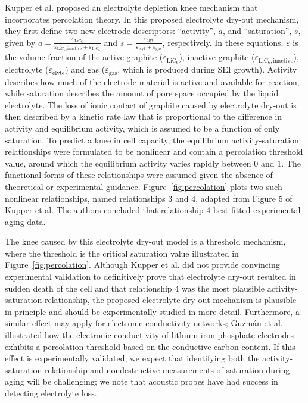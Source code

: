 \documentclass[journal=jpclcd,manuscript=article]{achemso}
\begin{document}
Kupper et al.\cite{kupper_end--life_2018} proposed an electrolyte depletion knee mechanism that incorporates percolation theory. In this proposed electrolyte dry-out mechanism, they first define two new electrode descriptors: ``activity'', $a$, and ``saturation'', $s$, given by $a = \frac{\varepsilon_{\text{LiC}_6}}{\varepsilon_{\text{LiC}_6,\text{inactive}}+\varepsilon_{\text{LiC}_6}}$ and $s = \frac{\varepsilon_\text{elyt}}{\varepsilon_\text{elyt}+\varepsilon_\text{gas}}$, respectively. In these equations, $\varepsilon$ is the volume fraction of the active graphite ($\varepsilon_{\text{LiC}_6}$), inactive graphite ($\varepsilon_{\text{LiC}_6,\text{inactive}}$), electrolyte ($\varepsilon_{\text{elyte}}$) and gas ($\varepsilon_{\text{gas}}$, which is produced during SEI growth). Activity describes how much of the electrode material is active and available for reaction, while saturation describes the amount of pore space occupied by the liquid electrolyte. The loss of ionic contact of graphite caused by electrolyte dry-out is then described by a kinetic rate law that is proportional to the difference in activity and equilibrium activity, which is assumed to be a function of only saturation. To predict a knee in cell capacity, the equilibrium activity-saturation relationships were formulated to be nonlinear and contain a percolation threshold value, around which the equilibrium activity varies rapidly between $0$ and $1$. The functional forms of these relationships were assumed given the absence of theoretical or experimental guidance. Figure~\ref{fig:percolation} plots two such nonlinear relationships, named relationships $3$ and $4$, adapted from Figure 5 of Kupper et al.\cite{kupper_end--life_2018} The authors concluded that relationship 4 best fitted experimental aging data.

The knee caused by this electrolyte dry-out model is a threshold mechanism, where the threshold is the critical saturation value illustrated in Figure~\ref{fig:percolation}. Although Kupper et al.\cite{kupper_end--life_2018} did not provide convincing experimental validation to definitively prove that electrolyte dry-out resulted in sudden death of the cell and that relationship 4 was the most plausible activity-saturation relationship, the proposed electrolyte dry-out mechanism is plausible in principle and should be experimentally studied in more detail. Furthermore, a similar effect may apply for electronic conductivity networks; Guzmán et al. \cite{guzman_improved_2017} illustrated how the electronic conductivity of lithium iron phosphate electrodes exhibits a percolation threshold based on the conductive carbon content.
If this effect is experimentally validated, we expect that identifying both the activity-saturation relationship and nondestructive measurements of saturation during aging will be challenging; we note that acoustic probes have had success in detecting electrolyte loss.\cite{knehr_understanding_2018}
\end{document}
